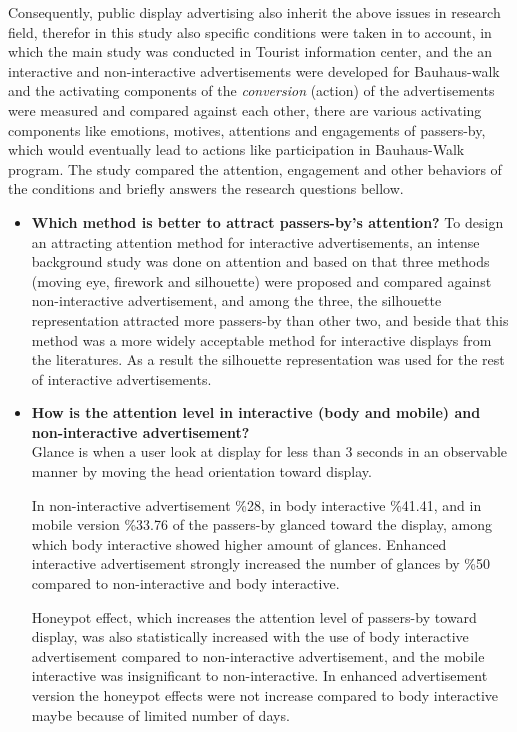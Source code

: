 Consequently, public display advertising also inherit the above issues in research field, therefor in this study also specific conditions were taken in to account, in which the main study was conducted in Tourist information center, and the an interactive and non-interactive advertisements were developed for Bauhaus-walk and the activating components of the \emph{conversion} (action) of the advertisements were measured and compared against each other, there are various activating components like emotions, motives, attentions and engagements of passers-by, which would eventually lead to actions like participation in Bauhaus-Walk program. The study compared the attention, engagement and other behaviors of the conditions and briefly answers the research questions bellow.




\begin{itemize}

\item \textbf{Which method is better to attract passers-by's attention?}
To design an attracting attention method for interactive advertisements, an intense background study was done on attention and based on that three methods (moving eye, firework and silhouette) were proposed and compared against non-interactive advertisement, and among the three, the silhouette representation attracted more passers-by than other two, and beside that this method was a more widely acceptable method for interactive displays from the literatures. As a result the silhouette representation was used for the rest of interactive advertisements.


\item \textbf{How is the attention level in interactive (body and mobile) and non-interactive advertisement?} \\
Glance is when a user look at display for less than 3 seconds in an observable manner by moving the head orientation toward display. 

In non-interactive advertisement \%28, in body interactive \%41.41, and in mobile version \%33.76 of the passers-by glanced toward the display, among which body interactive showed higher amount of glances. Enhanced interactive advertisement strongly increased the number of glances by \%50 compared to non-interactive and body interactive.

Honeypot effect, which increases the attention level of passers-by toward display, was also statistically increased with the use of body interactive advertisement compared to non-interactive advertisement, and the mobile interactive was insignificant to non-interactive. In enhanced advertisement version the honeypot effects were not increase compared to body interactive maybe because of limited number of days.


\end{itemize}
